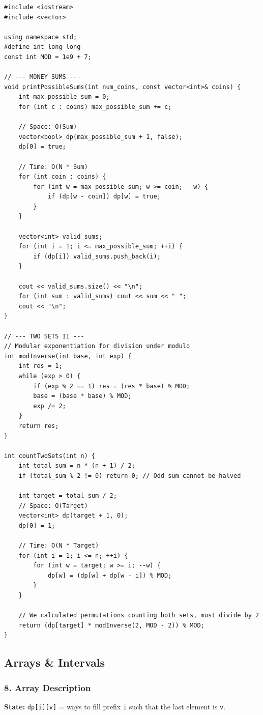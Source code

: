 \begin{lstlisting}
#include <iostream>
#include <vector>

using namespace std;
#define int long long
const int MOD = 1e9 + 7;

// --- MONEY SUMS ---
void printPossibleSums(int num_coins, const vector<int>& coins) {
    int max_possible_sum = 0;
    for (int c : coins) max_possible_sum += c;
    
    // Space: O(Sum)
    vector<bool> dp(max_possible_sum + 1, false);
    dp[0] = true;
    
    // Time: O(N * Sum)
    for (int coin : coins) {
        for (int w = max_possible_sum; w >= coin; --w) {
            if (dp[w - coin]) dp[w] = true;
        }
    }
    
    vector<int> valid_sums;
    for (int i = 1; i <= max_possible_sum; ++i) {
        if (dp[i]) valid_sums.push_back(i);
    }
    
    cout << valid_sums.size() << "\n";
    for (int sum : valid_sums) cout << sum << " ";
    cout << "\n";
}

// --- TWO SETS II ---
// Modular exponentiation for division under modulo
int modInverse(int base, int exp) {
    int res = 1;
    while (exp > 0) {
        if (exp % 2 == 1) res = (res * base) % MOD;
        base = (base * base) % MOD;
        exp /= 2;
    }
    return res;
}

int countTwoSets(int n) {
    int total_sum = n * (n + 1) / 2;
    if (total_sum % 2 != 0) return 0; // Odd sum cannot be halved
    
    int target = total_sum / 2;
    // Space: O(Target)
    vector<int> dp(target + 1, 0);
    dp[0] = 1;
    
    // Time: O(N * Target)
    for (int i = 1; i <= n; ++i) {
        for (int w = target; w >= i; --w) {
            dp[w] = (dp[w] + dp[w - i]) % MOD;
        }
    }
    
    // We calculated permutations counting both sets, must divide by 2
    return (dp[target] * modInverse(2, MOD - 2)) % MOD; 
}
\end{lstlisting}

\subsection{Arrays \& Intervals}

\subsubsection{8. Array Description}
\textbf{State:} \texttt{dp[i][v]} = ways to fill prefix \texttt{i} such that the last element is \texttt{v}.

